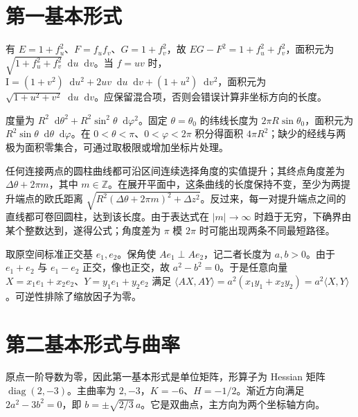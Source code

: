 \documentclass[UTF8,12pt,a4paper,fontset=fandol]{ctexbook}
\newcommand{\dd}{\mathop{}\!\mathrm d}
\newcommand{\ip}[2]{\langle #1,#2\rangle}
\begin{document}
\section{第一基本形式}
\begin{solve}
有 $E=1+f_u^2$、$F=f_uf_v$、$G=1+f_v^2$，故 $EG-F^2=1+f_u^2+f_v^2$，面积元为 $\sqrt{1+f_u^2+f_v^2}\dd u\dd v$。当 $f=uv$ 时，$\mathrm I=(1+v^2)\dd u^2+2uv\dd u\dd v+(1+u^2)\dd v^2$，面积元为 $\sqrt{1+u^2+v^2}\dd u\dd v$。应保留混合项，否则会错误计算非坐标方向的长度。
\end{solve}

\begin{solve}
度量为 $R^2\dd\theta^2+R^2\sin^2\theta\dd\varphi^2$。固定 $\theta=\theta_0$ 的纬线长度为 $2\pi R\sin\theta_0$，面积元为 $R^2\sin\theta\dd\theta\dd\varphi$。在 $0<\theta<\pi$、$0<\varphi<2\pi$ 积分得面积 $4\pi R^2$；缺少的经线与两极为面积零集合，可通过取极限或增加坐标片处理。
\end{solve}

\begin{solve}
任何连接两点的圆柱曲线都可沿区间连续选择角度的实值提升；其终点角度差为 $\Delta\theta+2\pi m$，其中 $m\in\mathbb Z$。在展开平面中，这条曲线的长度保持不变，至少为两提升端点的欧氏距离 $\sqrt{R^2(\Delta\theta+2\pi m)^2+\Delta z^2}$。反过来，每一对提升端点之间的直线都可卷回圆柱，达到该长度。由于表达式在 $|m|\to\infty$ 时趋于无穷，下确界由某个整数达到，遂得公式；角度差为 $\pi$ 模 $2\pi$ 时可能出现两条不同最短路径。
\end{solve}

\begin{solve}
取原空间标准正交基 $e_1,e_2$。保角使 $Ae_1\perp Ae_2$，记二者长度为 $a,b>0$。由于 $e_1+e_2$ 与 $e_1-e_2$ 正交，像也正交，故 $a^2-b^2=0$。于是任意向量 $X=x_1e_1+x_2e_2$、$Y=y_1e_1+y_2e_2$ 满足 $\ip{AX}{AY}=a^2(x_1y_1+x_2y_2)=a^2\ip XY$。可逆性排除了缩放因子为零。
\end{solve}

\section{第二基本形式与曲率}
\begin{solve}
原点一阶导数为零，因此第一基本形式是单位矩阵，形算子为 Hessian 矩阵 $\operatorname{diag}(2,-3)$。主曲率为 $2,-3$，$K=-6$、$H=-1/2$。渐近方向满足 $2a^2-3b^2=0$，即 $b=\pm\sqrt{2/3}\,a$。它是双曲点，主方向为两个坐标轴方向。
\end{solve}
\end{document}
